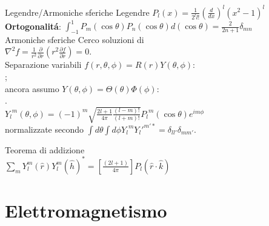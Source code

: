 \begin{frame}{Legendre/Armoniche sferiche}
Legendre
 $P_l(x)=\frac{1}{2^ll!}(\frac{d}{dx})^l(x^2-1)^l$\\
\textbf{Ortogonalit\'a}: $\int_{-1}^1P_m(\cos{\theta})P_n(\cos{\theta})d(\cos{\theta})=\frac{2}{2n+1}\delta_{mn}$\\

Armoniche sferiche
Cerco soluzioni di \\
$\nabla^2f=\frac{1}{r^2}\frac{\partial}{\partial r}(r^2\frac{\partial f}{\partial r})=0$.\\
Separazione variabili $f(r,\theta,\phi)=R(r)Y(\theta,\phi)$:\\
;\\
ancora assumo $Y(\theta,\phi)=\Theta(\theta)\Phi(\phi)$:\\
.\\
${Y_l}^m(\theta,\phi)=(-1)^m\sqrt{\frac{2l+1}{4\pi}\frac{(l-m)!}{(l+m)!}}{P_l}^m(\cos{\theta})e^{im\phi}$\\
normalizzate secondo $\int d\theta\int d\phi {Y_l}^m{Y_l'}^{m'*}=\delta_{ll'}\delta_{mm'}$.

Teorema di addizione\\
$\sum_mY_l^m(\hat{r}){Y_l^m(\hat{h})}^*=[\frac{(2l+1)}{4\pi}]P_l(\hat{r}\cdot\hat{k})$
    
\end{frame}

\section{Elettromagnetismo}

